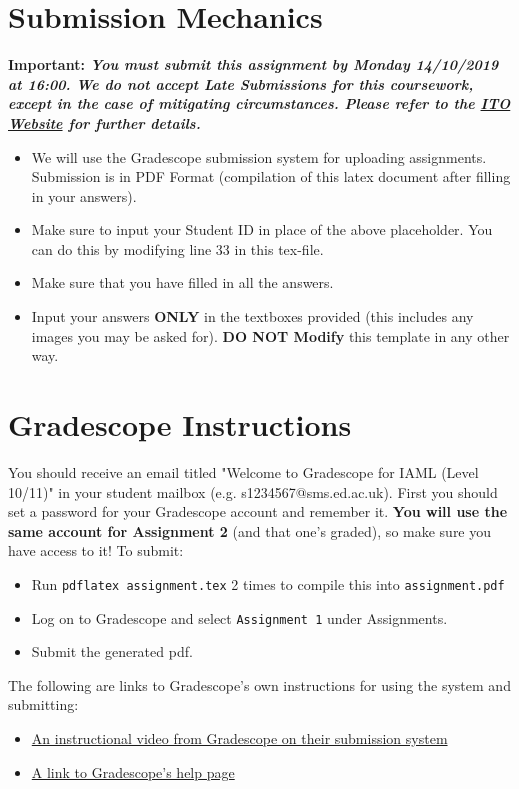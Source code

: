 \documentclass[12pt]{article}
\begin{document}
\section*{Submission Mechanics}
\textbf{Important: \textsl{You must submit this assignment by Monday 14/10/2019 at 16:00. We do not accept Late Submissions for this coursework, except in the case of mitigating circumstances. Please refer to the \href{http://web.inf.ed.ac.uk/infweb/student-services/ito/admin/coursework-projects/late-coursework-extension-requests}{ITO Website} for further details.}}\\[5pt]

\begin{itemize}
\item We will use the Gradescope submission system for uploading assignments. Submission is in PDF Format (compilation of this latex document after filling in your answers).
\item Make sure to input your Student ID in place of the above placeholder. You can do this by modifying line 33 in this tex-file.
\item Make sure that you have filled in all the answers.
\item Input your answers \textbf{ONLY} in the textboxes provided (this includes any images you may be asked for). \textbf{DO NOT Modify} this template in any other way.
\end{itemize}

\section*{Gradescope Instructions}
You should receive an email titled "Welcome to Gradescope for IAML (Level 10/11)" in your student mailbox (e.g. s1234567@sms.ed.ac.uk). First you should set a password for your Gradescope account and remember it. \textbf{You will use the same account for Assignment 2} (and that one's graded), so make sure you have access to it! To submit:

\begin{itemize}
\item Run \texttt{pdflatex assignment.tex} 2 times to compile this into \texttt{assignment.pdf}
\item Log on to Gradescope and select \texttt{Assignment 1} under Assignments.
\item Submit the generated pdf. 
\end{itemize}

The following are links to Gradescope's own instructions for using the system and submitting:
\begin{itemize}
    \item \href{https://www.youtube.com/watch?time_continue=2&v=KMPoby5g_nE}{An instructional video from Gradescope on their submission system}
    \item \href{https://www.gradescope.com/help}{A link to Gradescope's help page}
\end{itemize} 
\end{document}
